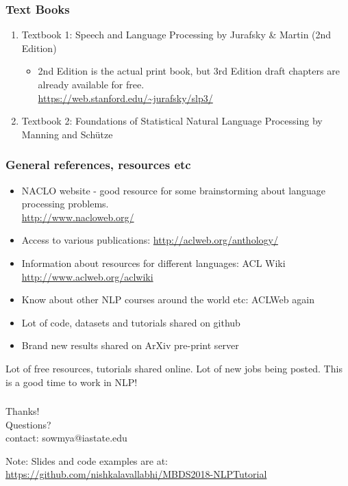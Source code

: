 \documentclass{beamer}
\begin{document}
\begin{frame}
\frametitle{Text Books}
\begin{enumerate}
\item Textbook 1: Speech and Language Processing by Jurafsky \& Martin (2nd Edition)
\begin{itemize}
\item 2nd Edition is the actual print book, but 3rd Edition draft chapters are already available for free. 
\\ \url{https://web.stanford.edu/~jurafsky/slp3/}
\end{itemize}
\item Textbook 2: Foundations of Statistical Natural Language Processing by Manning and Sch\"utze
\end{enumerate}
\end{frame}

\begin{frame}
\frametitle{General references, resources etc}
\begin{itemize}
\item NACLO website - good resource for some brainstorming about language processing problems. \\ \url{http://www.nacloweb.org/}
\item Access to various publications: \url{http://aclweb.org/anthology/} \\ 
\item Information about resources for different languages: ACL Wiki \url{http://www.aclweb.org/aclwiki}
\item Know about other NLP courses around the world etc: ACLWeb again
\item Lot of code, datasets and tutorials shared on github
\item Brand new results shared on ArXiv pre-print server
\end{itemize}
\pause Lot of free resources, tutorials shared online. Lot of new jobs being posted. This is a good time to work in NLP!
\end{frame}

\begin{frame}
\frametitle{}
\centering
Thanks! 
\\ Questions? \\ \bigskip
contact: sowmya@iastate.edu \\ \bigskip

Note: Slides and code examples are at: \footnotesize \url{https://github.com/nishkalavallabhi/MBDS2018-NLPTutorial}
\end{frame}
\end{document}
